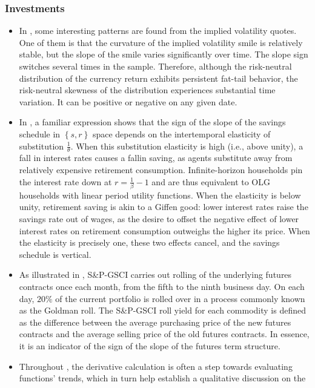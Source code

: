 \documentclass[11pt]{book}
\begin{document}
\subsubsection{Investments}
\begin{itemize}
\item In \cite{carr2007stochastic}, some interesting
patterns are found from the implied volatility quotes. One of them
is that the curvature of the implied volatility smile is relatively
stable, but the slope of the smile varies significantly over time.
The slope sign switches several times in the sample. Therefore, although
the risk-neutral distribution of the currency return exhibits persistent
fat-tail behavior, the risk-neutral skewness of the distribution experiences
substantial time variation. It can be positive or negative on any
given date.
\item In \cite{thwaites2015real},
a familiar expression shows that the sign of the slope of the savings
schedule in $\left\{ s,r\right\} $ space depends on the intertemporal
elasticity of substitution $\frac{1}{\theta}$. When this substitution
elasticity is high (i.e., above unity), a fall in interest rates causes
a fallin saving, as agents substitute away from relatively expensive
retirement consumption. Infinite-horizon households pin the interest
rate down at $r=\frac{1}{\beta}-1$ and are thus equivalent to OLG
households with linear period utility functions. When the elasticity
is below unity, retirement saving is akin to a Giffen good: lower
interest rates raise the savings rate out of wages, as the desire
to offset the negative effect of lower interest rates on retirement
consumption outweighs the higher its price. When the elasticity is
precisely one, these two effects cancel, and the savings schedule
is vertical.
\item As illustrated in \cite{leung2016speculative},
S\&P-GSCI carries out rolling of the underlying futures contracts
once each month, from the fifth to the ninth business day. On each
day, $20\%$ of the current portfolio is rolled over in a process
commonly known as the Goldman roll. The S\&P-GSCI roll yield for each
commodity is defined as the difference between the average purchasing
price of the new futures contracts and the average selling price of
the old futures contracts. In essence, it is an indicator of the sign
of the slope of the futures term structure.
\item Throughout \cite{skott2017weaknesses},
the derivative calculation is often a step towards evaluating functions'
trends, which in turn help establish a qualitative discussion on the

\end{itemize}
\end{document}
